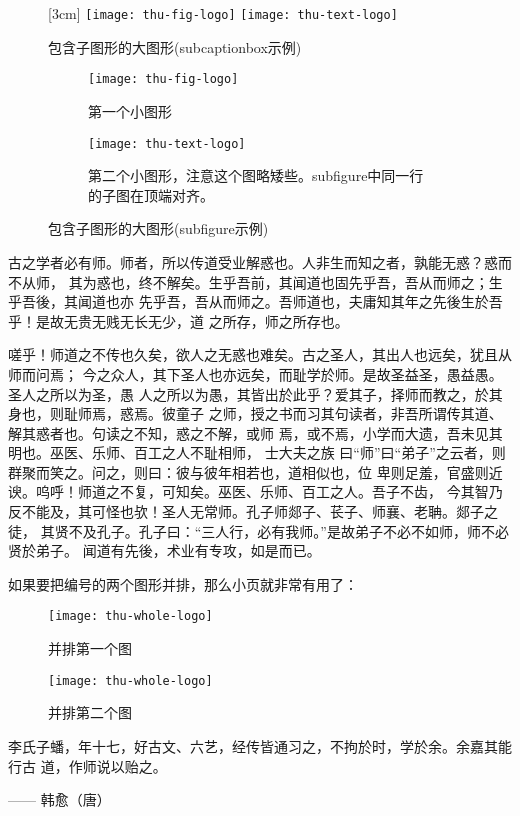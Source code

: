 \begin{figure}[h]
  \centering%
  [3cm] %
    {\texttt{[image: thu-fig-logo]}}%
  \hspace{4em}%
      {\texttt{[image: thu-text-logo]}}
  \caption{包含子图形的大图形(subcaptionbox示例)}
  \label{fig:big1-subcaptionbox}
\end{figure}
\begin{figure}[h]
  \centering%
  \begin{subfigure}{3cm}
    \texttt{[image: thu-fig-logo]}
    \caption{第一个小图形}
  \end{subfigure}%
  \hspace{4em}%
  \begin{subfigure}{0.5\textwidth}
    \texttt{[image: thu-text-logo]}
    \caption{第二个小图形，注意这个图略矮些。subfigure中同一行的子图在顶端对齐。}
  \end{subfigure}
  \caption{包含子图形的大图形(subfigure示例)}
  \label{fig:big1-subfigure}
\end{figure}

古之学者必有师。师者，所以传道受业解惑也。人非生而知之者，孰能无惑？惑而不从师，
其为惑也，终不解矣。生乎吾前，其闻道也固先乎吾，吾从而师之；生乎吾後，其闻道也亦
先乎吾，吾从而师之。吾师道也，夫庸知其年之先後生於吾乎！是故无贵无贱无长无少，道
之所存，师之所存也。

嗟乎！师道之不传也久矣，欲人之无惑也难矣。古之圣人，其出人也远矣，犹且从师而问焉；
今之众人，其下圣人也亦远矣，而耻学於师。是故圣益圣，愚益愚。圣人之所以为圣，愚
人之所以为愚，其皆出於此乎？爱其子，择师而教之，於其身也，则耻师焉，惑焉。彼童子
之师，授之书而习其句读者，非吾所谓传其道、解其惑者也。句读之不知，惑之不解，或师
焉，或不焉，小学而大遗，吾未见其明也。巫医、乐师、百工之人不耻相师，  士大夫之族
曰“师”曰“弟子”之云者，则群聚而笑之。问之，则曰：彼与彼年相若也，道相似也，位
卑则足羞，官盛则近谀。呜呼！师道之不复，可知矣。巫医、乐师、百工之人。吾子不齿，
今其智乃反不能及，其可怪也欤！圣人无常师。孔子师郯子、苌子、师襄、老聃。郯子之徒，
其贤不及孔子。孔子曰：“三人行，必有我师。”是故弟子不必不如师，师不必贤於弟子。
闻道有先後，术业有专攻，如是而已。

如果要把编号的两个图形并排，那么小页就非常有用了：
\begin{figure}
\begin{minipage}{0.48\textwidth}
  \centering
  \texttt{[image: thu-whole-logo]}
  \caption{并排第一个图}
  \label{fig:parallel1}
\end{minipage}\hfill
\begin{minipage}{0.48\textwidth}
  \centering
  \texttt{[image: thu-whole-logo]}
  \caption{并排第二个图}
  \label{fig:parallel2}
\end{minipage}
\end{figure}

李氏子蟠，年十七，好古文、六艺，经传皆通习之，不拘於时，学於余。余嘉其能行古
道，作师说以贻之。

\hfill —— 韩愈（唐）

